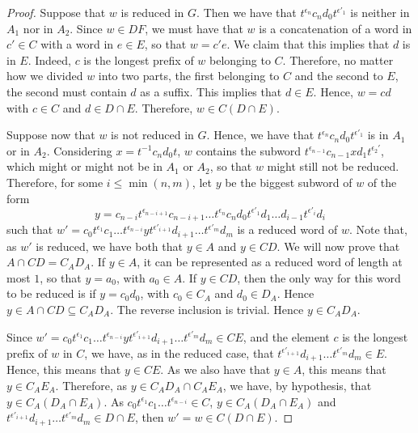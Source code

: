 \documentclass[11pt,letterpaper]{amsart}
\begin{document}
\begin{proof}
    Suppose that $w$ is reduced in $G$. Then we have that $t^{\epsilon_n} c_n d_0 t^{\epsilon'_1}$ is neither in $A_1$ nor in $A_2$. 
    Since $w \in DF$, we must have that $w$ is a concatenation of a word in $c'\in C$ with a word in $e \in E$, so that $w=c'e$. We claim that this implies that $d$ is in $E$. Indeed, $c$ is the longest prefix of $w$ belonging to $C$. Therefore, no matter how we divided $w$ into two parts, the first belonging to $C$ and the second to $E$, the second must contain $d$ as a suffix. This implies that $d \in E$. Hence, $w = cd$ with $c \in C$ and $d \in D \cap E$. Therefore, $w \in C(D \cap E)$.
    
    Suppose now that $w$ is not reduced in $G$. Hence, we have that $t^{\epsilon_n} c_n d_0 t^{\epsilon'_1}$ is in $A_1$ or in $A_2$. 
    Considering $x = t^{-1} c_n d_0 t$, $w$ contains the subword $t^{\epsilon_{n-1}}c_{n-1} x d_1 t^{\epsilon_2'}$, which might or might not be in $A_1$ or $A_2$, so that $w$ might still not be reduced.
    Therefore, for some $i\leq \min(n,m)$, let $y$ be the biggest subword of $w$ of the form 
    $$y = c_{n-i}t^{\epsilon_{n-i+1}}c_{n-i+1}\ldots t^{\epsilon_n} c_n d_0 t^{\epsilon'_1}d_1\ldots d_{i-1}t^{\epsilon'_i}d_i$$
    such that $ w' = c_0t^{\epsilon_1}c_1\ldots t^{\epsilon_{n-i}}yt^{\epsilon'_{i+1}} d_{i+1}\ldots t^{\epsilon'_m} d_m$ is a reduced word of $w$.
    Note that, as $w'$ is reduced, we have both that $y\in A$ and $y\in CD$. We will now prove that $A\cap CD = C_A D_A$. If $y\in A$, it can be represented as a reduced word of length at most $1$, so that $y=a_0$, with $a_0\in A$. If $y\in CD$, then the only way for this word to be reduced is if $y = c_0 d_0$, with $c_0\in C_A$ and $d_0\in D_A$. Hence $y\in A\cap CD\subseteq C_AD_A$. The reverse inclusion is trivial. Hence $y \in C_AD_A$.
    
    Since $w'=c_0t^{\epsilon_1}c_1\ldots t^{\epsilon_{n-i}}yt^{\epsilon'_{i+1}} d_{i+1}\ldots t^{\epsilon'_m} d_m \in CE$, and the element $c$ is the longest prefix of $w$ in $C$, we have, as in the reduced case, that $t^{\epsilon'_{i+1}} d_{i+1}\ldots t^{\epsilon'_m} d_m\in E$. Hence, this means that $y\in CE$. As we also have that $y\in A$, this means that $y\in C_AE_A$. Therefore, as $y\in C_AD_A\cap C_AE_A$, we have, by hypothesis, that $y\in C_A(D_A\cap E_A)$.
    As $c_0t^{\epsilon_1}c_1\ldots t^{\epsilon_{n-i}}\in C$, $y\in C_A(D_A\cap E_A)$ and $t^{\epsilon'_{i+1}} d_{i+1}\ldots t^{\epsilon'_m} d_m\in D\cap E$, then
    $w' = w \in C(D\cap E)$.
\end{proof}
\end{document}
